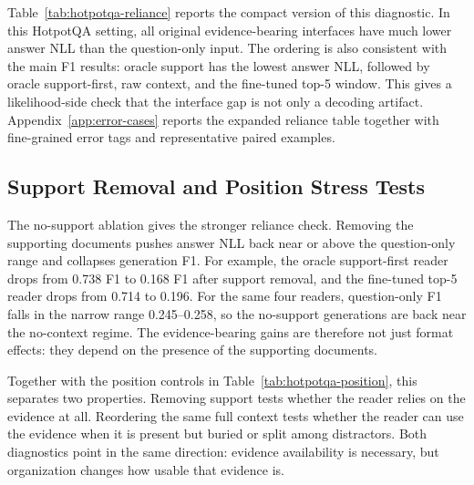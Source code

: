 \documentclass[a4paper,fleqn]{cas-sc}
\begin{document}
Table~\ref{tab:hotpotqa-reliance} reports the compact version of this
diagnostic. In this HotpotQA setting, all original evidence-bearing interfaces
have much lower answer NLL than the question-only input. The ordering is also consistent with the
main F1 results: oracle support has the lowest answer NLL, followed by
oracle support-first, raw context, and the fine-tuned top-5 window. This gives a
likelihood-side check that the interface gap is not only a decoding artifact.
Appendix~\ref{app:error-cases} reports the expanded reliance table together
with fine-grained error tags and representative paired examples.

\subsection{Support Removal and Position Stress Tests}

The no-support ablation gives the stronger reliance check. Removing the
supporting documents pushes answer NLL back near or above the question-only
range and collapses generation F1. For example, the oracle support-first reader drops
from 0.738 F1 to 0.168 F1 after support removal, and the fine-tuned top-5
reader drops from 0.714 to 0.196. For the same four readers, question-only F1
falls in the narrow range 0.245--0.258, so the no-support generations are back
near the no-context regime. The evidence-bearing gains are therefore not just
format effects: they depend on the presence of the supporting documents.

Together with the position controls in
Table~\ref{tab:hotpotqa-position}, this separates two properties. Removing
support tests whether the reader relies on the evidence at all. Reordering the
same full context tests whether the reader can use the evidence when it is
present but buried or split among distractors. Both diagnostics point in the
same direction: evidence availability is necessary, but organization changes
how usable that evidence is.
\end{document}
